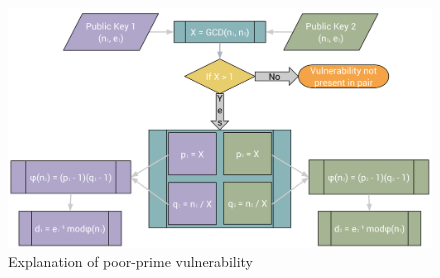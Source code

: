\documentclass[smallextended]{svjour3}       %
\begin{document}

\begin{figure}
   \centering
   \includegraphics[width=\textwidth]{vulnerability}
   \caption{Explanation of poor-prime vulnerability}
   \label{fig:vuln}
\end{figure}

\end{document}
